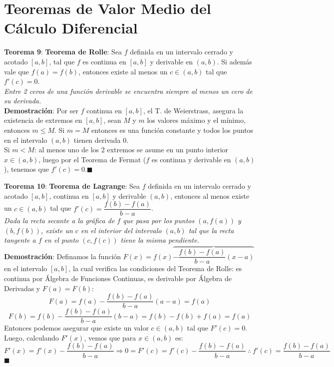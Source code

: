 \documentclass[11pt,a4paper]{article}
\newcommand*{\QEDA}{\null\nobreak\hfill\ensuremath{\blacksquare}}
\begin{document}
\section{Teoremas de Valor Medio del C\'alculo Diferencial}
\noindent \textbf{Teorema 9}: \textbf{Teorema de Rolle}: Sea $f$ definida en un intervalo cerrado y acotado $[a,b]$, tal que $f$ es continua en $[a,b]$ y derivable en $(a,b)$. Si adem\'as vale que $f(a)=f(b)$, entonces existe al menos un $c\in(a,b)$ tal que $f'(c)=0$.\\ 
\textit{Entre 2 ceros de una funci\'on derivable se encuentra siempre al menos un cero de su derivada.}\\
\noindent\textbf{Demostraci\'on}: Por ser $f$ continua en $[a,b]$, el T. de Weierstrass, asegura la existencia de extremos en $[a,b]$, sean $M$ y $m$ los valores m\'aximo y el m\'inimo, entonces $m \leq M$. Si $m=M$ entonces es una funci\'on constante y todos los puntos en el intervalo $(a,b)$ tienen derivada 0.\\
Si $m<M$: al menos uno de los 2 extremos se asume en un punto interior $x\in(a,b)$, luego por el Teorema de Fermat ($f$ es continua y derivable en $(a,b)$), tenemos que $f'(c)=0$.\QEDA\\

\newpage

\noindent \textbf{Teorema 10}: \textbf{Teorema de Lagrange}: Sea $f$ definida en un intervalo cerrado y acotado $[a,b]$, continua en $[a,b]$ y derivable $(a,b)$, entonces al menos existe un $c\in (a,b)$ tal que $f'(c) = \dfrac{f(b)-f(a)}{b-a}$.\\
\textit{Dada la recta secante a la gr\'afica de $f$ que pasa por los puntos $(a,f(a))$ y $(b,f(b))$, existe un $c$ en el interior del intervalo $(a,b)$ tal que la recta tangente a $f$ en el punto $(c,f(c))$ tiene la misma pendiente.}\\
\noindent \textbf{Demostraci\'on}: Definamos la funci\'on $F(x)=f(x) \overbrace{- \dfrac{f(b)-f(a)}{b-a}(x-a)}$ en el intervalo $[a,b]$, la cual verifica las condiciones del Teorema de Rolle: es continua por \'Algebra de Funciones Continuas, es derivable por \'Algebra de Derivadas y $F(a)=F(b)$: 
$$F(a)=f(a)-\dfrac{f(b)-f(a)}{b-a}(a-a) = f(a)$$
$$F(b)=f(b)-\dfrac{f(b)-f(a)}{b-a}(b-a) = f(b)-f(b)+f(a) = f(a)$$
Entonces podemos asegurar que existe un valor $c \in (a,b)$ tal que $F'(c)=0$. Luego, calculando $F'(x)$, vemos que para $x\in(a,b)$ es: $$F'(x) = f'(x)-\dfrac{f(b)-f(a)}{b-a} \Rightarrow 0=F'(c)=f'(c)-\dfrac{f(b)-f(a)}{b-a}\ \therefore\ f'(c)=\dfrac{f(b)-f(a)}{b-a}$$\QEDA\\
\end{document}
